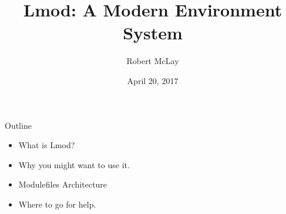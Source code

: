 \documentclass[dvipsnames,aspectratio=169]{beamer}
\begin{document}
\title[Lmod]{Lmod: A Modern Environment System}
\author{Robert McLay} 
\date{April 20, 2017} 


\frame{\titlepage} 

\begin{frame}{Outline}
  \begin{itemize}
    \item What is Lmod?
    \item Why you might want to use it.
    \item Modulefiles Architecture
    \item Where to go for help.
  \end{itemize}
\end{frame}



\end{document}
